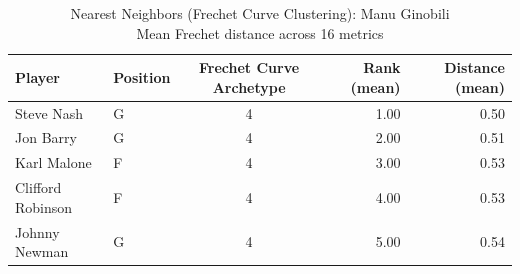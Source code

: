 \begin{table}[t]
\caption*{
{\fontsize{20}{25} Nearest Neighbors (Frechet Curve Clustering): Manu Ginobili\fontsize{12}{15}\selectfont } \\ 
{\fontsize{14}{17}\selectfont  Mean Frechet distance across 16 metrics\fontsize{12}{15}\selectfont }
} 
\fontsize{12.0pt}{14.0pt}\selectfont
\begin{tabular*}{\linewidth}{@{\extracolsep{\fill}}llcrr}
\toprule
Player & Position & Frechet Curve Archetype & Rank (mean) & Distance (mean) \\ 
\midrule\addlinespace[2.5pt]
Steve Nash & G & 4 & 1.00 & 0.50 \\ 
Jon Barry & G & 4 & 2.00 & 0.51 \\ 
Karl Malone & F & 4 & 3.00 & 0.53 \\ 
Clifford Robinson & F & 4 & 4.00 & 0.53 \\ 
Johnny Newman & G & 4 & 5.00 & 0.54 \\ 
\bottomrule
\end{tabular*}
\end{table}

